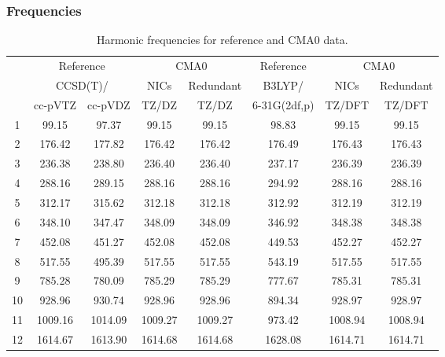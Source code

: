 \documentclass[10pt,oneside]{article}
\begin{document}
\begin{table}[h!]
\subsubsection*{Frequencies}
\centering
\caption{Harmonic frequencies for reference and CMA0 data.}
\begin{tabular}{cccccccc}
\toprule
{} & \multicolumn{2}{c}{Reference} & \multicolumn{2}{c}{CMA0} &    Reference & \multicolumn{2}{c}{CMA0} \\
{} & \multicolumn{2}{c}{CCSD(T)/} &    NICs &  Redundant &       B3LYP/ &    NICs & Redundant \\
{} &   cc-pVTZ & cc-pVDZ &   TZ/DZ &      TZ/DZ & 6-31G(2df,p) &  TZ/DFT &    TZ/DFT \\
\midrule
1  &     99.15 &   97.37 &   99.15 &      99.15 &        98.83 &   99.15 &     99.15 \\
2  &    176.42 &  177.82 &  176.42 &     176.42 &       176.49 &  176.43 &    176.43 \\
3  &    236.38 &  238.80 &  236.40 &     236.40 &       237.17 &  236.39 &    236.39 \\
4  &    288.16 &  289.15 &  288.16 &     288.16 &       294.92 &  288.16 &    288.16 \\
5  &    312.17 &  315.62 &  312.18 &     312.18 &       312.92 &  312.19 &    312.19 \\
6  &    348.10 &  347.47 &  348.09 &     348.09 &       346.92 &  348.38 &    348.38 \\
7  &    452.08 &  451.27 &  452.08 &     452.08 &       449.53 &  452.27 &    452.27 \\
8  &    517.55 &  495.39 &  517.55 &     517.55 &       543.19 &  517.55 &    517.55 \\
9  &    785.28 &  780.09 &  785.29 &     785.29 &       777.67 &  785.31 &    785.31 \\
10 &    928.96 &  930.74 &  928.96 &     928.96 &       894.34 &  928.97 &    928.97 \\
11 &   1009.16 & 1014.09 & 1009.27 &    1009.27 &       973.42 & 1008.94 &   1008.94 \\
12 &   1614.67 & 1613.90 & 1614.68 &    1614.68 &      1628.08 & 1614.71 &   1614.71 \\
\bottomrule
\end{tabular}
\end{table}
\end{document}
